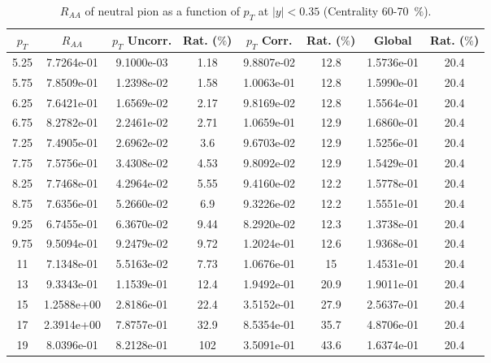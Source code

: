             
\begin{table}[!htb]
\centering
\begin{tabular}{|c|c|c|c|c|c|c|c|}
\hline
$p_{T}$ & $R_{AA}$ & $p_{T}$ Uncorr. & Rat. ($\%$) & $p_{T}$ Corr. & Rat. ($\%$) & Global & Rat. ($\%$)\\
\hline
5.25 & 7.7264e-01 & 9.1000e-03 & 1.18 & 9.8807e-02 & 12.8 & 1.5736e-01 & 20.4 \\ 
5.75 & 7.8509e-01 & 1.2398e-02 & 1.58 & 1.0063e-01 & 12.8 & 1.5990e-01 & 20.4 \\ 
6.25 & 7.6421e-01 & 1.6569e-02 & 2.17 & 9.8169e-02 & 12.8 & 1.5564e-01 & 20.4 \\ 
6.75 & 8.2782e-01 & 2.2461e-02 & 2.71 & 1.0659e-01 & 12.9 & 1.6860e-01 & 20.4 \\ 
7.25 & 7.4905e-01 & 2.6962e-02 & 3.6 & 9.6703e-02 & 12.9 & 1.5256e-01 & 20.4 \\ 
7.75 & 7.5756e-01 & 3.4308e-02 & 4.53 & 9.8092e-02 & 12.9 & 1.5429e-01 & 20.4 \\ 
8.25 & 7.7468e-01 & 4.2964e-02 & 5.55 & 9.4160e-02 & 12.2 & 1.5778e-01 & 20.4 \\ 
8.75 & 7.6356e-01 & 5.2660e-02 & 6.9 & 9.3226e-02 & 12.2 & 1.5551e-01 & 20.4 \\ 
9.25 & 6.7455e-01 & 6.3670e-02 & 9.44 & 8.2920e-02 & 12.3 & 1.3738e-01 & 20.4 \\ 
9.75 & 9.5094e-01 & 9.2479e-02 & 9.72 & 1.2024e-01 & 12.6 & 1.9368e-01 & 20.4 \\ 
11 & 7.1348e-01 & 5.5163e-02 & 7.73 & 1.0676e-01 & 15 & 1.4531e-01 & 20.4 \\ 
13 & 9.3343e-01 & 1.1539e-01 & 12.4 & 1.9492e-01 & 20.9 & 1.9011e-01 & 20.4 \\ 
15 & 1.2588e+00 & 2.8186e-01 & 22.4 & 3.5152e-01 & 27.9 & 2.5637e-01 & 20.4 \\ 
17 & 2.3914e+00 & 7.8757e-01 & 32.9 & 8.5354e-01 & 35.7 & 4.8706e-01 & 20.4 \\ 
19 & 8.0396e-01 & 8.2128e-01 & 102 & 3.5091e-01 & 43.6 & 1.6374e-01 & 20.4 \\ 
\hline
\end{tabular}
\caption{$R_{AA}$ of neutral pion as a function of $p_{T}$ at $|y|<0.35$ (Centrality 60-70~$\%$).}
\end{table}
            
